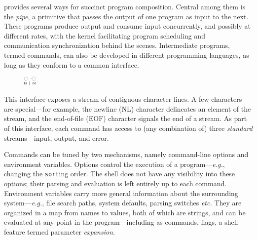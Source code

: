 \documentclass[sigplan,10pt,review,anonymous]{acmart}
\newcommand{\eg}{{\em e.g.}, }
\newcommand{\etc}{{\em etc.}\xspace}
\newcommand{\ttt}[1]{\texttt{\small #1}}
\newcommand{\kk}[1]{[{\color{magenta}#1 --- KK}]}
\begin{document}
\unix provides several ways for succinct program composition.
Central among them is the \emph{pipe}, a primitive that passes the output of one program as input to the next.
These programs produce output and consume input concurrently, and possibly at different rates, with the \unix kernel facilitating program scheduling and communication synchronization behind the scenes.
Intermediate programs, termed commands, can also be developed in different programming languages, as long as they conform to a common interface.
\begin{figure}
  \vspace{-12pt}
    \includegraphics[width=0.06\textwidth]{./figs/dish_ex1.pdf}
  \vspace{-30pt}
\end{figure}
This interface exposes a stream of contiguous character lines.
A few characters are special---for example, the newline (\textsc{NL}) character delineates an element of the stream, and the end-of-file (\textsc{EOF}) character signals the end of a stream.
As part of this interface, each command has access to (any combination of) three \emph{standard} streams---input, output, and error.

Commands can be tuned by two mechanisms, namely command-line options and environment variables.
Options control the execution of a program---\eg changing the \ttt{sort}ing order.
The shell does not have any visibility into these options; 
  their parsing and evaluation is left entirely up to each command.
Environment variables carry more general information about the surrounding system---\eg file search paths, system defaults, parsing switches \etc 
They are organized in a map from names to values, both of which are strings, and can be evaluated at any point in the program---including as commands, flags, a shell feature termed parameter \emph{expansion}.
\end{document}
